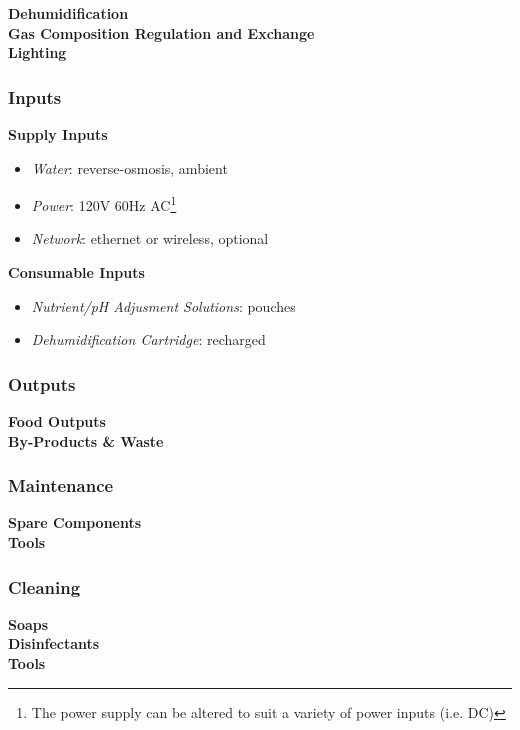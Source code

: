 \textbf{Dehumidification}\\


\textbf{Gas Composition Regulation and Exchange}\\


\textbf{Lighting}\\


\subsubsection{Inputs}

\textbf{Supply Inputs}
\begin{itemize}
    \item \textit{Water}: reverse-osmosis, ambient
    \item \textit{Power}: 120V 60Hz AC\footnote{The power supply can be altered to suit a variety of power inputs (i.e. DC)}
    \item \textit{Network}: ethernet or wireless, optional
\end{itemize}

\textbf{Consumable Inputs}
\begin{itemize}
    \item \textit{Nutrient/pH Adjusment Solutions}: pouches
    \item \textit{Dehumidification Cartridge}: recharged
\end{itemize}

\subsubsection{Outputs}

\textbf{Food Outputs}\\


\textbf{By-Products \& Waste}\\


\subsubsection{Maintenance}

\textbf{Spare Components}\\


\textbf{Tools}\\


\subsubsection{Cleaning}

\textbf{Soaps}\\


\textbf{Disinfectants}\\


\textbf{Tools}\\

